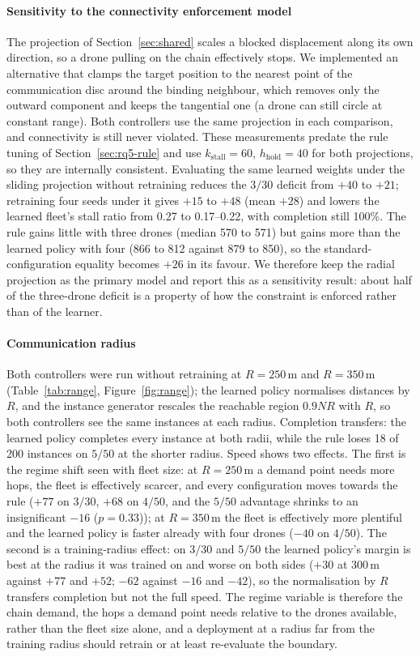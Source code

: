 \documentclass[final,5p,times,twocolumn]{elsarticle}
\begin{document}
\paragraph{Sensitivity to the connectivity enforcement model}
\label{sec:sensitivity}
The projection of Section~\ref{sec:shared} scales a blocked displacement along its own
direction, so a drone pulling on the chain effectively stops. We implemented an alternative that
clamps the target position to the nearest point of the communication disc around the binding
neighbour, which removes only the outward component and keeps the tangential one (a drone can
still circle at constant range). Both controllers use the same projection in each comparison, and
connectivity is still never violated. These measurements predate the rule tuning of Section~\ref{sec:rq5-rule} and use
$k_{\mathrm{stall}}=60$, $h_{\mathrm{hold}}=40$ for both projections, so they are internally
consistent. Evaluating the same learned weights under the sliding projection without retraining
reduces the $3/30$ deficit from $+40$ to $+21$; retraining four
seeds under it gives $+15$ to $+48$ (mean $+28$) and lowers the learned fleet's stall ratio from
0.27 to 0.17--0.22, with completion still 100\%. The rule gains little with three drones
(median 570 to 571) but gains more than the learned policy with four (866 to 812 against 879 to
850), so the standard-configuration equality becomes $+26$ in its favour. We therefore keep the radial
projection as the primary model and report this as a sensitivity result: about half of the
three-drone deficit is a property of how the constraint is enforced rather than of the learner.

\paragraph{Communication radius}
Both controllers were run without retraining at $R = 250$\,m and $R = 350$\,m
(Table~\ref{tab:range}, Figure~\ref{fig:range}); the learned policy normalises distances by $R$,
and the instance generator rescales the reachable region $0.9NR$ with $R$, so both controllers see
the same instances at each radius. Completion transfers: the learned policy completes every
instance at both radii, while the rule loses 18 of 200 instances on $5/50$ at the shorter
radius. Speed shows two effects. The first is the regime shift seen with fleet size: at
$R=250$\,m a demand point needs more hops, the fleet is effectively scarcer, and every
configuration moves towards the rule ($+77$ on $3/30$, $+68$ on $4/50$, and the $5/50$
advantage shrinks to an insignificant $-16$ ($p=0.33$)); at $R=350$\,m the fleet is effectively more
plentiful and the learned policy is faster already with four drones ($-40$ on $4/50$). The second
is a training-radius effect: on $3/30$ and $5/50$ the learned policy's margin is best at the
radius it was trained on and worse on both sides ($+30$ at 300\,m against $+77$ and $+52$;
$-62$ against $-16$ and $-42$), so the normalisation by $R$ transfers completion but not the full
speed. The regime variable is therefore the chain demand, the hops a demand point needs relative
to the drones available, rather than the fleet size alone, and a deployment at a radius far from
the training radius should retrain or at least re-evaluate the boundary.
\end{document}
